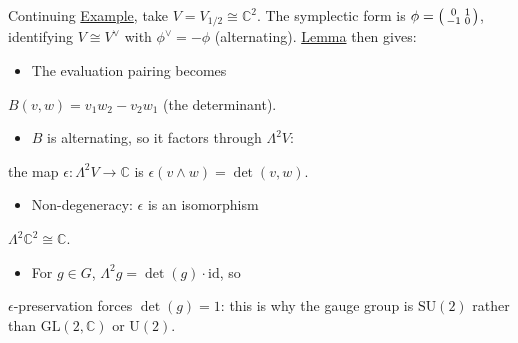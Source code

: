\begin{example}
  \label{ex:su2-volume-from-rigidity}
Continuing \hyperref[ex:qou-su2]{Example}, take $V = V_{1/2} \cong \mathbb{C}^2$.
The symplectic form is
$\phi = \begin{psmallmatrix} 0 & 1 \\ -1 & 0 \end{psmallmatrix}$,
identifying $V \cong V^{\vee}$ with $\phi^{\vee} = -\phi$ (alternating).
\hyperref[lem:volume-from-rigidity]{Lemma} then gives:

\begin{itemize}
  \item The evaluation pairing becomes
\end{itemize}
  $B(v, w) = v_1 w_2 - v_2 w_1$ (the determinant).
\begin{itemize}
  \item $B$ is alternating, so it factors through $\Lambda^2 V$:
\end{itemize}
  the map $\epsilon \colon \Lambda^2 V \to \mathbb{C}$ is
  $\epsilon(v \wedge w) = \det(v, w)$.
\begin{itemize}
  \item Non-degeneracy: $\epsilon$ is an isomorphism
\end{itemize}
  $\Lambda^2 \mathbb{C}^2 \cong \mathbb{C}$.
\begin{itemize}
  \item For $g \in G$, $\Lambda^2 g = \det(g) \cdot \mathrm{id}$, so
\end{itemize}
  $\epsilon$-preservation forces $\det(g) = 1$: this is why the
  gauge group is $\mathrm{SU}(2)$ rather than
  $\mathrm{GL}(2, \mathbb{C})$ or $\mathrm{U}(2)$.
\end{example}


